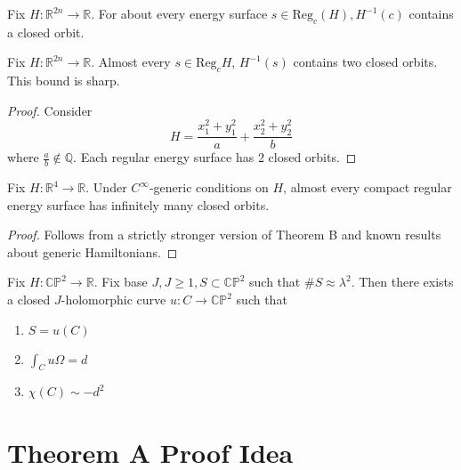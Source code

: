 \begin{theorem}

Fix $H:\mathbb{R}^{2n} \to \mathbb{R}$. For about every energy surface $s\in \text{Reg}_c(H), H^{-1}(c)$ contains a closed orbit.

\end{theorem}

\begin{theorem}

Fix $H:\mathbb{R}^{2n} \to \mathbb{R}$. Almost every $s\in \text{Reg}_c H$, $H^{-1}(s)$ contains two closed orbits. This bound is sharp.

\end{theorem}

\begin{proof}
Consider
\[
H=\dfrac{x_1^2+y_1^2}{a}+\dfrac{x_2^2+y_2^2}{b}
\]
where $\frac{a}{b}\notin \mathbb{Q}$. Each regular energy surface has 2 closed orbits.
\end{proof}

\begin{theorem}

Fix $H:\mathbb{R}^4\to \mathbb{R}$. Under $C^\infty$-generic conditions on $H$, almost every compact regular energy surface has infinitely many closed orbits.

\end{theorem}

\begin{proof}
Follows from a strictly stronger version of Theorem B and known results about generic Hamiltonians.
\end{proof}

\begin{theorem}
[Taubes]

Fix $H: \mathbb{CP}^2 \to \mathbb{R}$. Fix base $J, J\ge 1, S\subset \mathbb{CP}^2$ such that $\# S \approx \lambda^2$. Then there exists a closed $J$-holomorphic curve $u: C\to \mathbb{CP}^2$ such that
\begin{enumerate}
\item $S=u(C)$
\item $\int_C u\Omega = d$
\item $\chi(C)\sim -d^2$
\end{enumerate}

\end{theorem}

\section{Theorem A Proof Idea}

